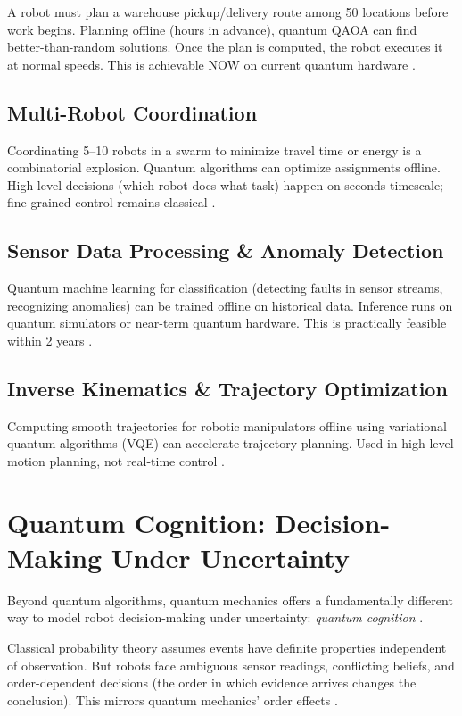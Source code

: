 \documentclass[conference]{IEEEtran}
\begin{document}
A robot must plan a warehouse pickup/delivery route among 50 locations before work begins. Planning offline (hours in advance), quantum QAOA can find better-than-random solutions. Once the plan is computed, the robot executes it at normal speeds. This is achievable NOW on current quantum hardware \cite{b15, b17, b18}.

\subsection{Multi-Robot Coordination}

Coordinating 5--10 robots in a swarm to minimize travel time or energy is a combinatorial explosion. Quantum algorithms can optimize assignments offline. High-level decisions (which robot does what task) happen on seconds timescale; fine-grained control remains classical \cite{b37, b38, b39}.

\subsection{Sensor Data Processing \& Anomaly Detection}

Quantum machine learning for classification (detecting faults in sensor streams, recognizing anomalies) can be trained offline on historical data. Inference runs on quantum simulators or near-term quantum hardware. This is practically feasible within 2 years \cite{b40, b41, b42}.

\subsection{Inverse Kinematics \& Trajectory Optimization}

Computing smooth trajectories for robotic manipulators offline using variational quantum algorithms (VQE) can accelerate trajectory planning. Used in high-level motion planning, not real-time control \cite{b43, b44, b34}.

\section{Quantum Cognition: Decision-Making Under Uncertainty}

Beyond quantum algorithms, quantum mechanics offers a fundamentally different way to model robot decision-making under uncertainty: \textit{quantum cognition} \cite{b45, b46, b47}.

Classical probability theory assumes events have definite properties independent of observation. But robots face ambiguous sensor readings, conflicting beliefs, and order-dependent decisions (the order in which evidence arrives changes the conclusion). This mirrors quantum mechanics' order effects \cite{b48, b49, b50}.
\end{document}
